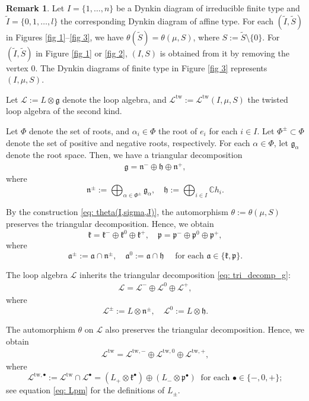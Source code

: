 \documentclass[12pt,a4paper]{amsart}
\theoremstyle{definition}
\newtheorem{rem}[thm]{Remark}
\numberwithin{equation}{subsection}
\begin{document}
\begin{rem}
  Let $I = \{ 1,\dots,n \}$ be a Dynkin diagram of irreducible finite type and $\tilde{I} = \{ 0,1,\dots,l \}$ the corresponding Dynkin diagram of affine type.
  For each $(\tilde{I},\tilde{S})$ in Figures \ref{fig 1}--\ref{fig 3}, we have $\theta(\tilde{S}) = \theta(\mu,S)$, where $S := \tilde{S} \setminus \{ 0 \}$.
  For $(\tilde{I},\tilde{S})$ in Figure \ref{fig 1} or \ref{fig 2}, $(I,S)$ is obtained from it by removing the vertex $0$.
  The Dynkin diagrams of finite type in Figure \ref{fig 3} represents $(I,\mu,S)$.
\end{rem}

Let $\mathcal{L} := L \otimes \mathfrak{g}$ denote the loop algebra, and $\mathcal{L}^\mathrm{tw} := \mathcal{L}^{\mathrm{tw}}(I,\mu,S)$ the twisted loop algebra of the second kind.

Let $\Phi$ denote the set of roots, and $\alpha_i \in \Phi$ the root of $e_i$ for each $i \in I$.
Let $\Phi^\pm \subset \Phi$ denote the set of positive and negative roots, respectively.
For each $\alpha \in \Phi$, let $\mathfrak{g}_\alpha$ denote the root space.
Then, we have a triangular decomposition
\begin{align}\label{eq: tri_decomp_g}
  \mathfrak{g} = \mathfrak{n}^- \oplus \mathfrak{h} \oplus \mathfrak{n}^+,
\end{align}
where
\[
  \mathfrak{n}^\pm := \bigoplus_{\alpha \in \Phi^\pm} \mathfrak{g}_\alpha, \quad \mathfrak{h} := \bigoplus_{i \in I} \mathbb{C} h_i.
\]

By the construction \eqref{eq: theta(I,sigma,J)}, the automorphism $\theta := \theta(\mu,S)$ preserves the triangular decomposition.
Hence, we obtain
\[
  \mathfrak{k} = \mathfrak{k}^- \oplus \mathfrak{k}^0 \oplus \mathfrak{k}^+,\quad \mathfrak{p} = \mathfrak{p}^- \oplus \mathfrak{p}^0 \oplus \mathfrak{p}^+,
\]
where
\[
  \mathfrak{a}^\pm := \mathfrak{a} \cap \mathfrak{n}^\pm, \quad \mathfrak{a}^0 := \mathfrak{a} \cap \mathfrak{h} \quad \text{ for each } \mathfrak{a} \in \{ \mathfrak{k},\mathfrak{p} \}.
\]

The loop algebra $\mathcal{L}$ inherits the triangular decomposition \eqref{eq: tri_decomp_g}:
\begin{align}\label{eq: tri decomp clL}
  \mathcal{L} = \mathcal{L}^- \oplus \mathcal{L}^0 \oplus \mathcal{L}^+,
\end{align}
where
\[
  \mathcal{L}^\pm := L \otimes \mathfrak{n}^\pm, \quad \mathcal{L}^0 := L \otimes \mathfrak{h}.
\]

The automorphism $\theta$ on $\mathcal{L}$ also preserves the triangular decomposition.
Hence, we obtain
\begin{align}\label{eq: tri decomp clLtw}
  \mathcal{L}^\mathrm{tw} = \mathcal{L}^{\mathrm{tw}, -} \oplus \mathcal{L}^{\mathrm{tw}, 0} \oplus \mathcal{L}^{\mathrm{tw}, +},
\end{align}
where
\[
  \mathcal{L}^{\mathrm{tw}, \bullet} := \mathcal{L}^\mathrm{tw} \cap \mathcal{L}^\bullet = (L_+ \otimes \mathfrak{k}^\bullet) \oplus (L_- \otimes \mathfrak{p}^\bullet) \ \text{ for each } \bullet \in \{ -,0,+ \};
\]
see equation \eqref{eq: Lpm} for the definitions of $L_\pm$.
\end{document}

